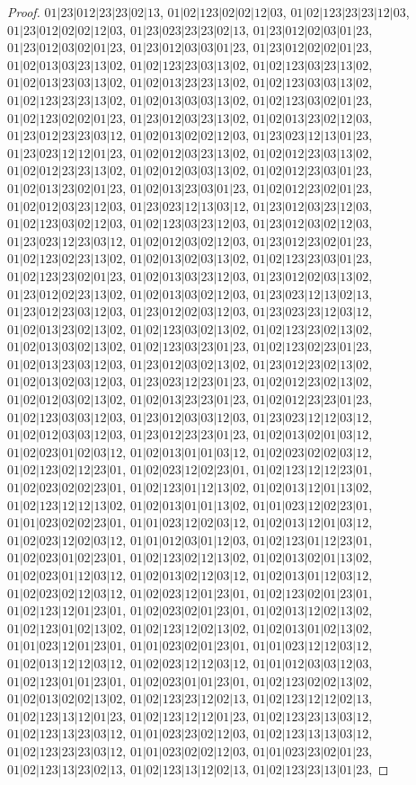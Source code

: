 \documentclass[12pt]{article}
\theoremstyle{plain}
\theoremstyle{definition}
\theoremstyle{remark}
\begin{document}
\begin{proof}
$01|23|012|23|23|02|13$, $01|02|123|02|02|12|03$, $01|02|123|23|23|12|03$, $01|23|012|02|02|12|03$, $01|23|023|23|23|02|13$, $01|23|012|02|03|01|23$, $01|23|012|03|02|01|23$, $01|23|012|03|03|01|23$, $01|23|012|02|02|01|23$, $01|02|013|03|23|13|02$, $01|02|123|23|03|13|02$, $01|02|123|03|23|13|02$, $01|02|013|23|03|13|02$, $01|02|013|23|23|13|02$, $01|02|123|03|03|13|02$, $01|02|123|23|23|13|02$, $01|02|013|03|03|13|02$, $01|02|123|03|02|01|23$, $01|02|123|02|02|01|23$, $01|23|012|03|23|13|02$, $01|02|013|23|02|12|03$, $01|23|012|23|23|03|12$, $01|02|013|02|02|12|03$, $01|23|023|12|13|01|23$, $01|23|023|12|12|01|23$, $01|02|012|03|23|13|02$, $01|02|012|23|03|13|02$, $01|02|012|23|23|13|02$, $01|02|012|03|03|13|02$, $01|02|012|23|03|01|23$, $01|02|013|23|02|01|23$, $01|02|013|23|03|01|23$, $01|02|012|23|02|01|23$, $01|02|012|03|23|12|03$, $01|23|023|12|13|03|12$, $01|23|012|03|23|12|03$, $01|02|123|03|02|12|03$, $01|02|123|03|23|12|03$, $01|23|012|03|02|12|03$, $01|23|023|12|23|03|12$, $01|02|012|03|02|12|03$, $01|23|012|23|02|01|23$, $01|02|123|02|23|13|02$, $01|02|013|02|03|13|02$, $01|02|123|23|03|01|23$, $01|02|123|23|02|01|23$, $01|02|013|03|23|12|03$, $01|23|012|02|03|13|02$, $01|23|012|02|23|13|02$, $01|02|013|03|02|12|03$, $01|23|023|12|13|02|13$, $01|23|012|23|03|12|03$, $01|23|012|02|03|12|03$, $01|23|023|23|12|03|12$, $01|02|013|23|02|13|02$, $01|02|123|03|02|13|02$, $01|02|123|23|02|13|02$, $01|02|013|03|02|13|02$, $01|02|123|03|23|01|23$, $01|02|123|02|23|01|23$, $01|02|013|23|03|12|03$, $01|23|012|03|02|13|02$, $01|23|012|23|02|13|02$, $01|02|013|02|03|12|03$, $01|23|023|12|23|01|23$, $01|02|012|23|02|13|02$, $01|02|012|03|02|13|02$, $01|02|013|23|23|01|23$, $01|02|012|23|23|01|23$, $01|02|123|03|03|12|03$, $01|23|012|03|03|12|03$, $01|23|023|12|12|03|12$, $01|02|012|03|03|12|03$, $01|23|012|23|23|01|23$, $01|02|013|02|01|03|12$, $01|02|023|01|02|03|12$, $01|02|013|01|01|03|12$, $01|02|023|02|02|03|12$, $01|02|123|02|12|23|01$, $01|02|023|12|02|23|01$, $01|02|123|12|12|23|01$, $01|02|023|02|02|23|01$, $01|02|123|01|12|13|02$, $01|02|013|12|01|13|02$, $01|02|123|12|12|13|02$, $01|02|013|01|01|13|02$, $01|01|023|12|02|23|01$, $01|01|023|02|02|23|01$, $01|01|023|12|02|03|12$, $01|02|013|12|01|03|12$, $01|02|023|12|02|03|12$, $01|01|012|03|01|12|03$, $01|02|123|01|12|23|01$, $01|02|023|01|02|23|01$, $01|02|123|02|12|13|02$, $01|02|013|02|01|13|02$, $01|02|023|01|12|03|12$, $01|02|013|02|12|03|12$, $01|02|013|01|12|03|12$, $01|02|023|02|12|03|12$, $01|02|023|12|01|23|01$, $01|02|123|02|01|23|01$, $01|02|123|12|01|23|01$, $01|02|023|02|01|23|01$, $01|02|013|12|02|13|02$, $01|02|123|01|02|13|02$, $01|02|123|12|02|13|02$, $01|02|013|01|02|13|02$, $01|01|023|12|01|23|01$, $01|01|023|02|01|23|01$, $01|01|023|12|12|03|12$, $01|02|013|12|12|03|12$, $01|02|023|12|12|03|12$, $01|01|012|03|03|12|03$, $01|02|123|01|01|23|01$, $01|02|023|01|01|23|01$, $01|02|123|02|02|13|02$, $01|02|013|02|02|13|02$, $01|02|123|23|12|02|13$, $01|02|123|12|12|02|13$, $01|02|123|13|12|01|23$, $01|02|123|12|12|01|23$, $01|02|123|23|13|03|12$, $01|02|123|13|23|03|12$, $01|01|023|23|02|12|03$, $01|02|123|13|13|03|12$, $01|02|123|23|23|03|12$, $01|01|023|02|02|12|03$, $01|01|023|23|02|01|23$, $01|02|123|13|23|02|13$, $01|02|123|13|12|02|13$, $01|02|123|23|13|01|23$, 
\end{proof}
\end{document}
